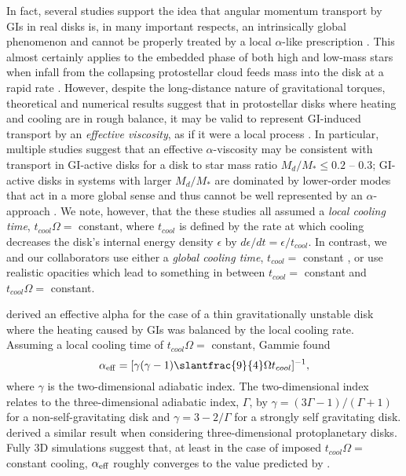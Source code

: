 \documentclass[manuscript]{aastex}
\begin{document}
In fact, several studies support the idea that angular momentum transport by GIs in real disks is, in many important respects, an intrinsically global phenomenon and cannot be properly treated by a local $\alpha$-like prescription \citep{laughlin1996, balbus1999, lodato2005, mejia2005, boley2006, cai2008}.  This almost certainly applies to the embedded phase of both high and low-mass stars when infall from the collapsing protostellar cloud feeds mass into the disk at a rapid
rate \citep[e.g.,][]{yorke1993, laughlin1994, yorke1999,vorobyov2005,vorobyov2006}.  
However, despite the long-distance nature of gravitational torques, theoretical and numerical results suggest that in protostellar disks where heating and cooling are in rough balance, 
 it may be valid to represent GI-induced transport by an {\it effective viscosity}, as if it were a local process \citep{gammie2001, lodato2004, rice2005, cossins2009, vorobyov2010}.  In particular, multiple studies suggest that
an effective $\alpha$-viscosity may be consistent
with transport in GI-active disks for a disk to star mass ratio $M_d/M_* \le 0.2$ -- 0.3; GI-active disks
in systems with larger $M_d/M_*$ are dominated by lower-order modes that act in a more global sense and thus cannot be well represented by an $\alpha$-approach
\citep{lodato2004, cossins2009, vorobyov2010}. 
We note, however, that the these studies all assumed
a {\it local cooling time}, $t_{cool}\Omega =$ constant, 
where $t_{cool}$ is defined by the rate at which cooling decreases the disk's internal energy density
$\epsilon$ by $d\epsilon/dt = \epsilon / t_{cool}$.  In contrast, we and our collaborators use either a {\it global cooling time},
$t_{cool} = $ constant \citep[e.g.,][this paper]{pickett2003, mejia2005}, or use realistic opacities \citep[e.g.,][]{mejiaphd2004, cai2006, cai2008, boley2006, boley2007,  boley2009} which lead to something in between $t_{cool} = $ constant  and
$t_{cool}\Omega =$ constant. 

\citet{gammie2001} derived an effective alpha for the case of a thin gravitationally unstable disk where the heating caused by GIs was balanced by the local cooling rate.  
Assuming a local cooling time of $t_{cool}\Omega =$ constant,  Gammie found
\begin{equation}
\alpha_{\rm{eff}} = [\gamma(\gamma - 1) \slantfrac{9}{4}\Omega t_{cool}]^{-1},
\label{eq:gammie}
\end{equation}
where $\gamma$ is the two-dimensional adiabatic index. 
The two-dimensional index relates
to the three-dimensional adiabatic index, $\Gamma$, by 
$\gamma = (3\Gamma - 1) / (\Gamma + 1)$
for a non-self-gravitating
disk and
$\gamma = 3 - 2/\Gamma $
for a strongly self gravitating disk.   \cite{lodato2004} derived a similar result when considering three-dimensional protoplanetary disks.
Fully 3D simulations \citep[e.g.,][]{lodato2004, cossins2009} suggest that, at least in the case of imposed 
$t_{cool}\Omega = $ constant cooling, $\alpha_{\rm{\rm{eff}}}$ roughly converges to the value predicted by \citeauthor{gammie2001}. 
\end{document}
